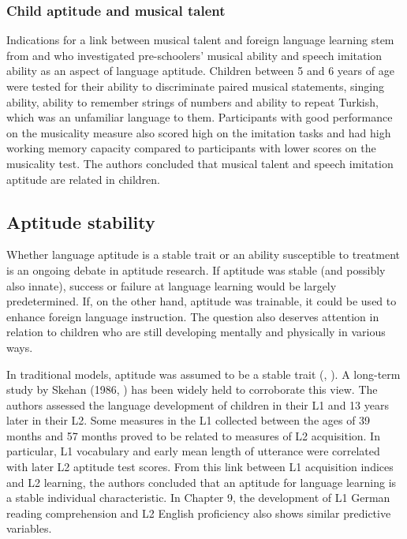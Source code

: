 \documentclass[output=paper]{langscibook}
\begin{document}
\subsubsection{Child aptitude and musical talent} %

Indications for a link between musical talent and foreign language learning stem from \citet[$n=35$]{ChristinerReiterer2018} and \citet[$n=36$]{Christiner2018} who investigated pre-schoolers’ musical ability and speech imitation ability as an aspect of language aptitude. Children between 5 and 6 years of age were tested for their ability to discriminate paired musical statements, singing ability, ability to remember strings of numbers and ability to repeat Turkish, which was an unfamiliar language to them. Participants with good performance on the musicality measure also scored high on the imitation tasks and had high working memory capacity compared to participants with lower scores on the musicality test. The authors concluded that musical talent and speech imitation aptitude are related in children. 

\subsection{Aptitude stability}\label{sec:01:2.3} %

Whether language aptitude is a stable trait or an ability susceptible to treatment is an ongoing debate in aptitude research. If aptitude was stable (and possibly also innate), success or failure at language learning would be largely predetermined. If, on the other hand, aptitude was trainable, it could be used to enhance foreign language instruction. The question also deserves attention in relation to children who are still developing mentally and physically in various ways. 

In traditional models, aptitude was assumed to be a stable trait (\citealt{Skehan1998}, \citealt{Singleton2017}). A long-term study by Skehan (1986, \citealt{SkehanDucroquet1988}) has been widely held to corroborate this view. The authors assessed the language development of children in their L1 and 13 years later in their L2. Some measures in the L1 collected between the ages of 39 months and 57 months proved to be related to measures of L2 acquisition. In particular, L1 vocabulary and early mean length of utterance were correlated with later L2 aptitude test scores. From this link between L1 acquisition indices and L2 learning, the authors concluded that an aptitude for language learning is a stable individual characteristic. In Chapter 9, the development of L1 German reading comprehension and L2 English proficiency also shows similar predictive variables. 
\end{document}
